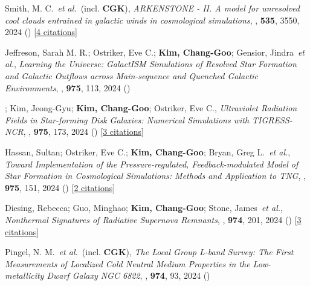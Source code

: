 \item[{17.}]Smith, M. C.~\textit{et al.}~(incl. \textbf{CGK}), \textit{ARKENSTONE - II. A model for unresolved cool clouds entrained in galactic winds in cosmological simulations}, , \textbf{535}, 3550, 2024 () [\href{http://adsabs.harvard.edu/abs/2024MNRAS.535.3550S}{4 citations}]

\item[{16.}]Jeffreson, Sarah M. R.; Ostriker, Eve C.; \textbf{Kim, Chang-Goo}; Gensior, Jindra~\textit{et al.}, \textit{Learning the Universe: GalactISM Simulations of Resolved Star Formation and Galactic Outflows across Main-sequence and Quenched Galactic Environments}, , \textbf{975}, 113, 2024 ()

\item[{15.}]; Kim, Jeong-Gyu; \textbf{Kim, Chang-Goo}; Ostriker, Eve C., \textit{Ultraviolet Radiation Fields in Star-forming Disk Galaxies: Numerical Simulations with TIGRESS-NCR}, , \textbf{975}, 173, 2024 () [\href{http://adsabs.harvard.edu/abs/2024ApJ...975..173L}{3 citations}]

\item[{14.}]Hassan, Sultan; Ostriker, Eve C.; \textbf{Kim, Chang-Goo}; Bryan, Greg L.~\textit{et al.}, \textit{Toward Implementation of the Pressure-regulated, Feedback-modulated Model of Star Formation in Cosmological Simulations: Methods and Application to TNG}, , \textbf{975}, 151, 2024 () [\href{http://adsabs.harvard.edu/abs/2024ApJ...975..151H}{2 citations}]

\item[{13.}]Diesing, Rebecca; Guo, Minghao; \textbf{Kim, Chang-Goo}; Stone, James~\textit{et al.}, \textit{Nonthermal Signatures of Radiative Supernova Remnants}, , \textbf{974}, 201, 2024 () [\href{http://adsabs.harvard.edu/abs/2024ApJ...974..201D}{3 citations}]

\item[{12.}]Pingel, N. M.~\textit{et al.}~(incl. \textbf{CGK}), \textit{The Local Group L-band Survey: The First Measurements of Localized Cold Neutral Medium Properties in the Low-metallicity Dwarf Galaxy NGC 6822}, , \textbf{974}, 93, 2024 ()

